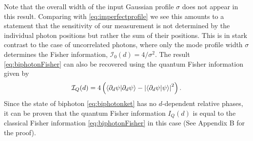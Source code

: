 Note that the overall width of the input Gaussian profile $\sigma$ does not appear in this result.
Comparing with \eqref{eq:imperfectprofile} we see this amounts to a statement that the sensitivity of our measurement is not determined by the individual photon positions but rather the sum of their positions.  
This is in stark contrast to the case of uncorrelated photons, where only the mode profile width $\sigma$ determines the Fisher information, $\mathcal{I}_0(d) = 4/\sigma^2$.
The result \eqref{eq:biphotonFisher} can also be recovered using the quantum Fisher information given by \cite{Braunstein1996}
\begin{align}
	\mathcal{I}_Q(d) = 4\left(\langle \partial_d \psi \vert \partial_d \psi \rangle - \left|\langle \partial_d \psi \vert \psi \rangle\right|^2\right).
\end{align}
Since the state of biphoton \eqref{eq:biphotonket} has no $d$-dependent relative phases, it can be proven that the quantum Fisher information $I_Q(d)$ is equal to the classical Fisher information \eqref{eq:biphotonFisher} in this case (See Appendix B for the proof).

